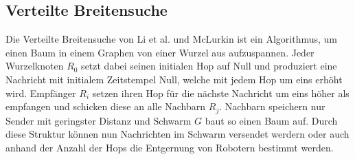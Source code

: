 \subsection{Verteilte Breitensuche}

Die Verteilte Breitensuche von Li et al. und McLurkin ist ein Algorithmus, um einen Baum in einem 
Graphen von einer Wurzel aus aufzuspannen. Jeder Wurzelknoten $R_0$ setzt dabei seinen initialen Hop 
auf Null und produziert eine Nachricht mit initialem Zeitstempel Null, welche mit jedem Hop um eins 
erhöht wird. Empfänger $R_i$ setzen ihren Hop für die nächste Nachricht um eins höher als empfangen 
und schicken diese an alle Nachbarn $R_j$. Nachbarn speichern nur Sender mit geringster Distanz und 
Schwarm $G$ baut so einen Baum auf. Durch diese Struktur können nun Nachrichten im Schwarm versendet
werdern oder auch anhand der Anzahl der Hops die Entgernung von Robotern bestimmt werden.
